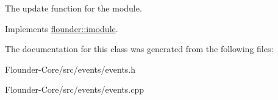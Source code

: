 The update function for the module. 



Implements \hyperlink{classflounder_1_1imodule_a9a53d48a46b5f6b16a92b2cd8503f74a}{flounder\+::imodule}.



The documentation for this class was generated from the following files\+:\begin{DoxyCompactItemize}
\item 
Flounder-\/\+Core/src/events/events.\+h\item 
Flounder-\/\+Core/src/events/events.\+cpp\end{DoxyCompactItemize}
